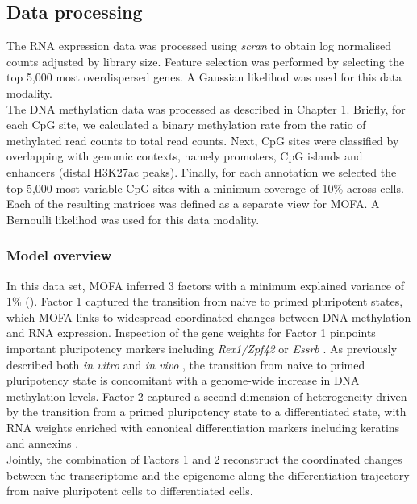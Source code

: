 \subsection{Data processing}

The RNA expression data was processed using \textit{scran}\cite{Lun2016b} to obtain log normalised counts adjusted by library size. Feature selection was performed by selecting the top 5,000 most overdispersed genes\cite{Lun2016a}. A Gaussian likelihod was used for this data modality. \\
The DNA methylation data was processed as described in Chapter 1. Briefly, for each CpG site, we calculated a binary methylation rate from the ratio of methylated read counts to total read counts. Next, CpG sites were classified by overlapping with genomic contexts, namely promoters, CpG islands and enhancers (distal H3K27ac peaks). Finally, for each annotation we selected the top 5,000 most variable CpG sites with a minimum coverage of 10\% across cells. Each of the resulting matrices was defined as a separate view for MOFA. A Bernoulli likelihod was used for this data modality.


\subsubsection{Model overview}

In this data set, MOFA inferred 3 factors with a minimum explained variance of 1\% (). Factor 1 captured the transition from naive to primed pluripotent states, which MOFA links to widespread coordinated changes between DNA methylation and RNA expression. Inspection of the gene weights for Factor 1 pinpoints important pluripotency markers including  \textit{Rex1/Zpf42} or \textit{Essrb} \cite{Mohammed2017}. As previously described both \textit{in vitro} \cite{Angermueller2016} and \textit{in vivo} \cite{Auclair2014}, the transition from naive to primed pluripotency state is concomitant with a genome-wide increase in DNA methylation levels. Factor 2 captured a second dimension of heterogeneity driven by the transition from a primed pluripotency state to a differentiated state, with RNA weights enriched with canonical differentiation markers including keratins and annexins \cite{Fuchs1988}.\\
Jointly, the combination of Factors 1 and 2 reconstruct the coordinated changes between the transcriptome and the epigenome along the differentiation trajectory from naive pluripotent cells to differentiated cells.

